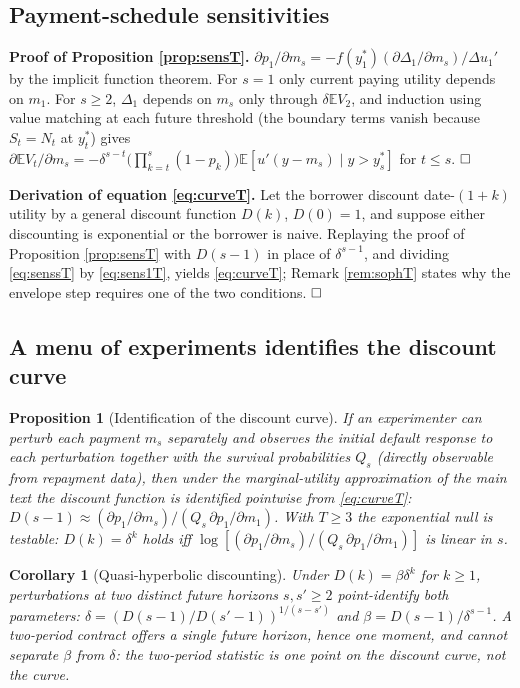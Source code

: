 \documentclass[12pt,english]{article}
\newtheorem{corollary}[theorem]{Corollary}
\newtheorem{proposition}[theorem]{Proposition}
\begin{document}
\subsection{Payment-schedule sensitivities}\label{appendix:sensproofs}

\noindent\textbf{Proof of Proposition \ref{prop:sensT}.} $\partial p_1/\partial m_s = -f(y_1^*)(\partial\Delta_1/\partial m_s)/\Delta u_1'$ by the implicit function theorem. For $s=1$ only current paying utility depends on $m_1$. For $s \ge 2$, $\Delta_1$ depends on $m_s$ only through $\delta\mathbb{E}V_2$, and induction using value matching at each future threshold (the boundary terms vanish because $S_t = N_t$ at $y_t^*$) gives $\partial \mathbb{E}V_t/\partial m_s = -\delta^{s-t}\big(\prod_{k=t}^{s}(1-p_k)\big)\mathbb{E}[u'(y-m_s) \mid y > y_s^*]$ for $t \le s$. $\hfill\square$

\noindent\textbf{Derivation of equation \eqref{eq:curveT}.} Let the borrower discount date-$(1+k)$ utility by a general discount function $D(k)$, $D(0)=1$, and suppose either discounting is exponential or the borrower is naive. Replaying the proof of Proposition \ref{prop:sensT} with $D(s-1)$ in place of $\delta^{s-1}$, and dividing \eqref{eq:senssT} by \eqref{eq:sens1T}, yields \eqref{eq:curveT}; Remark \ref{rem:sophT} states why the envelope step requires one of the two conditions. $\hfill\square$

\subsection{A menu of experiments identifies the discount curve}

\begin{proposition}[Identification of the discount curve]\label{prop:curveT}
If an experimenter can perturb each payment $m_s$ separately and observes the initial default response to each perturbation together with the survival probabilities $Q_s$ (directly observable from repayment data), then under the marginal-utility approximation of the main text the discount function is identified pointwise from \eqref{eq:curveT}: $D(s-1) \approx (\partial p_1/\partial m_s)/(Q_s\,\partial p_1/\partial m_1)$. With $T \ge 3$ the exponential null is testable: $D(k) = \delta^k$ holds iff $\log[(\partial p_1/\partial m_s)/(Q_s\,\partial p_1/\partial m_1)]$ is linear in $s$.
\end{proposition}

\begin{corollary}[Quasi-hyperbolic discounting]\label{cor:betadeltaT}
Under $D(k) = \beta\delta^k$ for $k \ge 1$, perturbations at two distinct future horizons $s, s' \ge 2$ point-identify both parameters: $\delta = (D(s-1)/D(s'-1))^{1/(s-s')}$ and $\beta = D(s-1)/\delta^{s-1}$. A two-period contract offers a single future horizon, hence one moment, and cannot separate $\beta$ from $\delta$: the two-period statistic is one point on the discount curve, not the curve.
\end{corollary}
\end{document}
